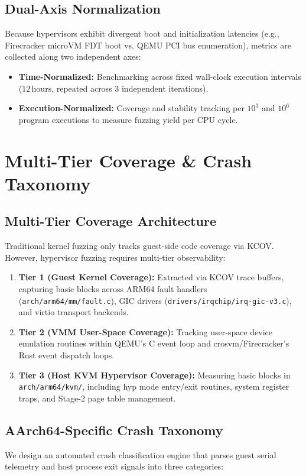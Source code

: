 \documentclass{article}
\begin{document}
\subsection{Dual-Axis Normalization}
Because hypervisors exhibit divergent boot and initialization latencies (e.g., Firecracker microVM FDT boot vs. QEMU PCI bus enumeration), metrics are collected along two independent axes:
\begin{itemize}[leftmargin=*]
    \item \textbf{Time-Normalized:} Benchmarking across fixed wall-clock execution intervals ($12\,\text{hours}$, repeated across 3 independent iterations).
    \item \textbf{Execution-Normalized:} Coverage and stability tracking per $10^3$ and $10^6$ program executions to measure fuzzing yield per CPU cycle.
\end{itemize}


\section{Multi-Tier Coverage \& Crash Taxonomy}\label{sec:impl}

\subsection{Multi-Tier Coverage Architecture}
Traditional kernel fuzzing only tracks guest-side code coverage via KCOV. However, hypervisor fuzzing requires multi-tier observability:
\begin{enumerate}[leftmargin=*]
    \item \textbf{Tier 1 (Guest Kernel Coverage):} Extracted via KCOV trace buffers, capturing basic blocks across ARM64 fault handlers (\texttt{arch/arm64/mm/fault.c}), GIC drivers (\texttt{drivers/irqchip/irq-gic-v3.c}), and virtio transport backends.
    \item \textbf{Tier 2 (VMM User-Space Coverage):} Tracking user-space device emulation routines within QEMU's C event loop and crosvm/Firecracker's Rust event dispatch loops.
    \item \textbf{Tier 3 (Host KVM Hypervisor Coverage):} Measuring basic blocks in \texttt{arch/arm64/kvm/}, including hyp mode entry/exit routines, system register traps, and Stage-2 page table management.
\end{enumerate}

\subsection{AArch64-Specific Crash Taxonomy}
We design an automated crash classification engine that parses guest serial telemetry and host process exit signals into three categories:
\end{document}
